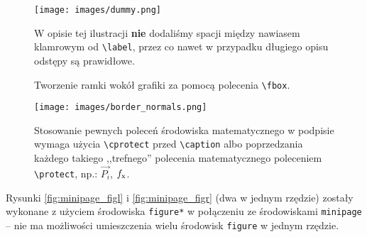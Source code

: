 \documentclass[pdftex,11pt,a4paper]{article}
\begin{document}
\begin{figure}[H]
	\centering
	\texttt{[image: images/dummy.png]}
	\cprotect\caption{\label{fig:long_caption_without_space}W opisie tej ilustracji \textbf{nie} dodaliśmy spacji między nawiasem klamrowym od \verb|\label|, przez co nawet w przypadku długiego opisu odstępy są prawidłowe.}
\end{figure}


\begin{figure}[H]
	\setlength{\fboxsep}{0pt}  %
	\setlength{\fboxrule}{2pt}  %
	
	\centering

	
	\setlength{\captionmargin}{2cm}
	\cprotect\caption{\label{fig:fbox}Tworzenie ramki wokół grafiki za pomocą polecenia \verb|\fbox|.}
\end{figure}

\begin{figure}[H]
	\centering
	\texttt{[image: images/border\_normals.png]}
	\cprotect\caption{\label{fig:border_normals}Stosowanie pewnych poleceń środowiska matematycznego w podpisie wymaga użycia \lstinline|\cprotect| przed \lstinline|\caption| albo poprzedzania każdego takiego ,,trefnego'' polecenia matematycznego poleceniem \lstinline|\protect|, np.: 
	$\overrightarrow{P_i}$, $f_\protect\mathrm{x}$.}
\end{figure}


Rysunki \ref{fig:minipage_figl} i \ref{fig:minipage_figr} (dwa w jednym rzędzie) zostały wykonane z użyciem środowiska \lstinline|figure*| w połączeniu ze środowiskami \lstinline|minipage| -- nie ma możliwości umieszczenia wielu środowisk \lstinline|figure| w jednym rzędzie.
\end{document}
